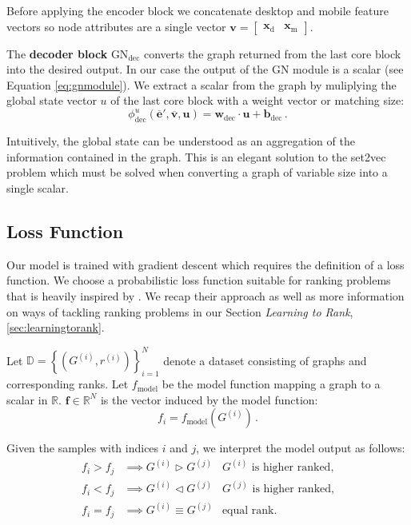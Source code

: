 Before applying the encoder block we concatenate desktop and mobile feature vectors so node attributes are a single vector $\bm{v}=\begin{bmatrix}\bm{x}_\text{d} & \bm{x}_\text{m}\end{bmatrix}$.

The \textbf{decoder block} $\text{GN}_\text{dec}$ converts the graph returned from the last core block into the desired output. In our case the output of the GN module is a scalar (see Equation \ref{eq:gnmodule}). We extract a scalar from the graph by muliplying the global state vector $u$ of the last core block with a weight vector or matching size:
\begin{equation}
    \label{eq:dec:nodeupdate}
    \phi^u_\text{dec}\left(\bm{\overline{e}}',\bm{\overline{v}},\bm{u}\right)=\bm{w}_\text{dec}\cdot\bm{u}+\bm{b}_\text{dec}\,.
\end{equation}

Intuitively, the global state can be understood as an aggregation of the information contained in the graph. This is an elegant solution to the set2vec problem which must be solved when converting a graph of variable size into a single scalar.

\subsection{Loss Function}
\label{sec:loss}

Our model is trained with gradient descent which requires the definition of a loss function. We choose a probabilistic loss function suitable for ranking problems that is heavily inspired by \cite{Burges:learningtorankwithsgd}. We recap their approach as well as more information on ways of tackling ranking problems in our Section \textit{Learning to Rank}, \ref{sec:learningtorank}.

Let $\mathbb{D}=\left\{\left(G^{(i)},r^{(i)}\right)\right\}_{i=1}^N$ denote a dataset consisting of graphs and corresponding ranks. Let $f_\text{model}$ be the model function mapping a graph to a scalar in $\mathbb{R}$. $\bm{f}\in\mathbb{R}^N$ is the vector induced by the model function:
\begin{equation}
    f_i=f_\text{model}\left(G^{(i)}\right)\,.
\end{equation}

Given the samples with indices $i$ and $j$, we interpret the model output as follows:
\begin{align}
    f_i>f_j&\implies G^{(i)}\triangleright G^{(j)}&G^{(i)}\text{ is higher ranked,}\\
    f_i<f_j&\implies G^{(i)}\triangleleft G^{(j)}&G^{(j)}\text{ is higher ranked,}\\
    f_i=f_j&\implies G^{(i)}\equiv G^{(j)}&\text{equal rank.}
\end{align}

